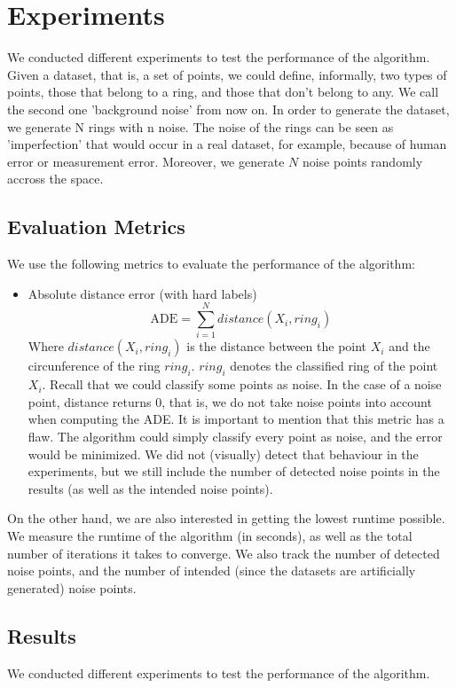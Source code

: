 \documentclass[conference]{IEEEtran}
\begin{document}
\section{Experiments}
We conducted different experiments to test the performance of the algorithm. Given a dataset, that is, a set of points, we could define, informally,
two types of points, those that belong to a ring, and those that don't belong to any. We call the second one 'background noise' from now on.
In order to generate the dataset, we generate N rings with n noise. The noise of the rings can be seen as 'imperfection' that would occur in a real dataset,
for example, because of human error or measurement error.
Moreover, we generate $N$ noise points randomly accross the space.
\subsection{Evaluation Metrics}
We use the following metrics to evaluate the performance of the algorithm:
\begin{itemize}
    \item Absolute distance error (with hard labels)
    \begin{equation}
        \text{ADE} = \sum_{i=1}^{N} distance(X_i, ring_i)
    \end{equation}
    Where $distance(X_i, ring_i)$ is the distance between the point $X_i$ and the circunference of the ring $ring_i$.
    $ring_i$ denotes the classified ring of the point $X_i$.
    Recall that we could classify some points as noise. In the case of a noise point, distance returns 0, that is,
    we do not take noise points into account when computing the ADE.
    It is important to mention that this metric has a flaw. The algorithm could simply classify every point as noise, and the error would be minimized.
    We did not (visually) detect that behaviour in the experiments, but we still include the number of detected noise points in the results (as well as the intended noise points).
\end{itemize}
On the other hand, we are also interested in getting the lowest runtime possible. We measure the runtime of the algorithm (in seconds), as well as the total number of iterations it takes to converge.
We also track the number of detected noise points, and the number of intended (since the datasets are artificially generated) noise points.
\subsection{Results}
We conducted different experiments to test the performance of the algorithm.
\end{document}
